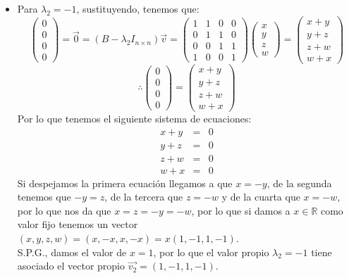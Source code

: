 \begin{enumerate}
\begin{itemize}
\item Para $\lambda_2=-1$, sustituyendo, tenemos que:
    \[\begin{pmatrix}0\\
0\\0\\0\end{pmatrix}=\vec{0}=(B-\lambda_2I_{n\times n })\vec{v}=\begin{pmatrix}1&1&0&0\\
0& 1 &1& 0\\
0&0&1&1\\
1&0&0&1\end{pmatrix}\begin{pmatrix}x\\
y\\z\\w\end{pmatrix}=\begin{pmatrix}x+y\\
y+z\\z+w\\w+x\end{pmatrix}\]
\[\therefore \begin{pmatrix}0\\
0\\0\\0\end{pmatrix}=\begin{pmatrix}x+y\\
y+z\\z+w\\w+x\end{pmatrix}\]
Por lo que tenemos el siguiente sistema de ecuaciones:
\begin{eqnarray*}
x+y&=&0\\
y+z&=&0\\z+w&=&0\\w+x&=&0
\end{eqnarray*}
Si despejamos la primera ecuaci\'on llegamos a que $x=-y$, de la segunda tenemos que $-y=z$, de la tercera que $z=-w$ y de la cuarta que $x=-w$, por lo que nos da que $x=z=-y=-w$, por lo que si damos a $x\in\mathbb{R}$ como valor fijo tenemos un vector $(x,y,z,w)=(x,-x,x,-x)=x(1,-1,1,-1)$.\\
S.P.G., damos el valor de $x=1$, por lo que el valor propio $\lambda_2=-1$ tiene asociado el vector propio $\vec{v_2}=(1,-1,1,-1)$.



\end{itemize}
\end{enumerate}
